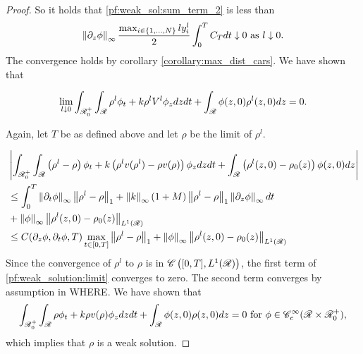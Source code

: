 \begin{proof}
 	 So it holds that \eqref{pf:weak_sol:sum_term_2} is less than 
 	\begin{align}
 		\left\lVert\partial_z \phi\right\rVert_\infty  \frac{\max_{i \in \{1,...,N\}} ly_i^l}{2} \int_0^T C_T dt \downarrow 0 \text{ as } l \downarrow 0. 
 	\end{align}
 	The convergence holds by corollary \eqref{corollary:max_dist_cars}. We have shown that 
 	
 	\begin{align}
	 	\lim_{l \downarrow 0} \int_{\mathscr{R}_0^+}\int_{\mathscr{R}} \rho^l \phi_t + k \rho^l V^l \phi_z dz dt +\int_{\mathscr{R}} \phi(z,0) \rho^l(z,0) dz= 0.
 	\end{align}
 	
 	Again, let $T$ be as defined above and let $\rho$ be the limit of $\rho^l$. 
 	
 	\begin{align}
 		&\left|\int_{\mathscr{R}_0^+}\int_{\mathscr{R}} \left(\rho^l - \rho\right)  \phi_t + k \left(\rho^l v(\rho^l) - \rho v(\rho)\right) \phi_z dz dt  + \int_{\mathscr{R}} \left(\rho^l(z,0) - \rho_0(z)\right)\phi(z,0) dz \right| \nonumber\\ &\leq \int_0^T \left\lVert\partial_t \phi\right\rVert_\infty \left\lVert\rho^l - \rho\right\rVert_1 + \left\lVert k\right\rVert_\infty \left(1 + M \right) \left\lVert\rho^l - \rho\right\rVert_1 \left\lVert\partial_z\phi\right\rVert_\infty dt \\
 		&+\left\lVert\phi\right\rVert_\infty \left\lVert\rho^l(z,0) - \rho_0(z)\right\rVert_{L^1\left(\mathscr{R}\right)}\\
 		&\leq C(\partial_z \phi, \partial_t \phi,T) \max_{t \in [0,T]} \left\lVert\rho^l - \rho\right\rVert_{1} +\left\lVert\phi\right\rVert_\infty \left\lVert\rho^l(z,0) - \rho_0(z)\right\rVert_{L^1\left(\mathscr{R}\right)} \label{pf:weak_solution:limit}
 	\end{align}
 	Since the convergence of $\rho^l$ to $\rho$ is in $\mathscr{C}\left([0,T], L^1(\mathscr{R})\right)$, the first term of \eqref{pf:weak_solution:limit} converges to zero. The second term converges by assumption in WHERE. We have shown that 
 	\begin{equation}
 		\int_{\mathscr{R}_0^+}\int_{\mathscr{R}} \rho \phi_t + k \rho v(\rho) \phi_z dz dt +\int_{\mathscr{R}} \phi(z,0) \rho(z,0) dz= 0 \text{ for } \phi \in \mathscr{C}^\infty_c(\mathscr{R} \times \mathscr{R}^+_0),\nonumber 
 	\end{equation}
 	which implies that $\rho$ is a weak solution. 
\end{proof}



